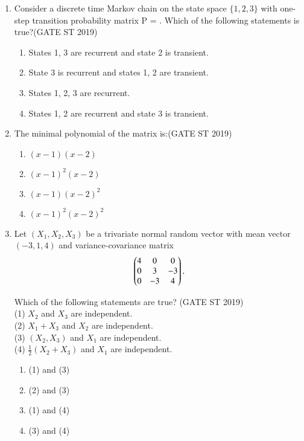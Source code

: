 \documentclass[journal]{IEEEtran}
\begin{document}
\begin{enumerate}[start=1]
\item Consider a discrete time Markov chain on the state space \(\{1,2,3\}\) with one-step transition probability matrix
P = .
Which of the following statements is true?\hfill(GATE ST 2019)
\begin{enumerate}
\item States 1, 3 are recurrent and state 2 is transient.
\item State 3 is recurrent and states 1, 2 are transient.
\item States 1, 2, 3 are recurrent.
\item States 1, 2 are recurrent and state 3 is transient.
\end{enumerate}

\item The minimal polynomial of the matrix
is:\hfill(GATE ST 2019)
\begin{enumerate}
\item \((x - 1)(x - 2)\)
\item \((x - 1)^2 (x - 2)\)
\item \((x - 1)(x - 2)^2\)
\item \((x - 1)^2 (x - 2)^2\)
\end{enumerate}

\item Let \((X_1, X_2, X_3)\) be a trivariate normal random vector with mean vector \((-3, 1, 4)\) and variance-covariance matrix
\begin{align*}
\begin{pmatrix}4 & 0 & 0 \\
0 & 3 & -3 \\
0 & -3 & 4\end{pmatrix}.
\end{align*}

Which of the following statements are true? \hfill(GATE ST 2019) \\
(1) \(X_2\) and \(X_3\) are independent.\\
(2) \(X_1 + X_3\) and \(X_2\) are independent.\\
(3) \((X_2, X_3)\) and \(X_1\) are independent.\\
(4) \(\frac{1}{2}(X_2 + X_3)\) and \(X_1\) are independent.
\begin{multicols}{2}
\begin{enumerate}
    \item (1) and (3)
    \item (2) and (3)
    \item (1) and (4)
    \item (3) and (4)
\end{enumerate}
\end{multicols}


\end{enumerate}
\end{document}
